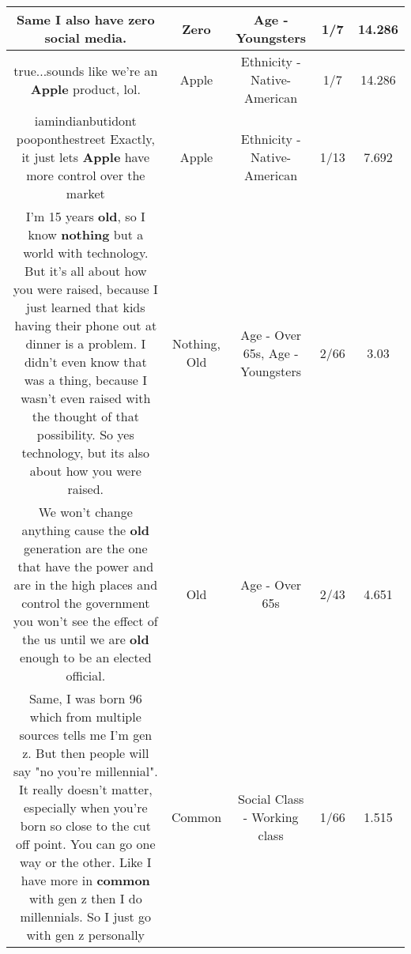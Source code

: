 \documentclass[11pt]{article}
\newlength\mylength
\begin{document}
\begin{center}
\begin{longtable}{|C{.65\mylength}|C{.30\mylength}|C{.12\mylength}|C{.12\mylength}|C{.12\mylength}|}
  \small Same I also have \textbf{zero} social media.\normalsize   & Zero & Age - Youngsters & 1/7 & 14.286 \\  \hline
  \small true...sounds like we're an \textbf{Apple} product, lol.\normalsize   & Apple & Ethnicity - Native-American & 1/7 & 14.286 \\  \hline
  \small iamindianbutidont pooponthestreet Exactly, it just lets \textbf{Apple} have more control over the market\normalsize   & Apple & Ethnicity - Native-American & 1/13 & 7.692 \\  \hline
  \small I'm 15 years \textbf{old}, so I know \textbf{nothing} but a world with technology. But it's all about how you were raised, because I just learned that kids having their phone out at dinner is a problem. I didn't even know that was a thing, because I wasn't even raised with the thought of that possibility. So yes technology, but its also about how you were raised.\normalsize   & Nothing, Old & Age - Over 65s, Age - Youngsters & 2/66 & 3.03 \\  \hline
  \small We won't change anything cause the \textbf{old} generation are the one that have the power and are in the high places and control the government you won't see the effect of the us until we are \textbf{old} enough to be an elected official.\normalsize   & Old & Age - Over 65s & 2/43 & 4.651 \\  \hline
  \small Same, I was born 96 which from multiple sources tells me I'm gen z. But then people will say "no you're millennial". It really doesn't matter, especially when you're born so close to the cut off point. You can go one way or the other. Like I have more in \textbf{common} with gen z then I do millennials. So I just go with gen z personally\normalsize   & Common & Social Class - Working class & 1/66 & 1.515 \\  \hline

\end{longtable}
\end{center}
\end{document}
